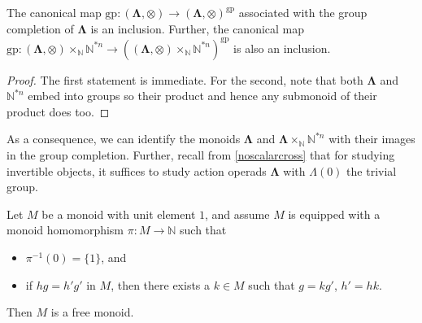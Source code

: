 \documentclass{amsbook} %
\newcommand{\ML}{\mathbf{\Lambda}}
\numberwithin{section}{chapter}
\begin{document}
\begin{cor} \label{gpcompin} The canonical map $\mathrm{gp} : (\ML, \otimes) \to (\ML, \otimes)^{\mathrm{gp}}$ associated with the group completion of $\ML$ is an inclusion. Further, the canonical map $\mathrm{gp} : (\ML, \otimes) \times_{\mathbb{N}} \mathbb{N}^{\ast n} \to ((\ML, \otimes) \times_{\mathbb{N}} \mathbb{N}^{\ast n})^{\mathrm{gp}}$  is also an inclusion.
\end{cor}
\begin{proof}
The first statement is immediate. For the second, note that both $\ML$ and $\mathbb{N}^{\ast n}$ embed into groups so their product and hence any submonoid of their product does too.
\end{proof}

As a consequence, we can identify the monoids $\ML$ and $\ML\times_{\mathbb{N}} \mathbb{N}^{\ast n}$ with their images in the group completion. Further, recall from \cref{noscalarcross} that for studying invertible objects, it suffices to study action operads $\ML$ with $\Lambda(0)$ the trivial group.

\begin{prop}\label{Gfree}
Let $M$ be a monoid with unit element $1$, and assume $M$ is equipped with a monoid homomorphism $\pi: M \to \mathbb{N}$ such that 
\begin{itemize}
\item $\pi^{-1}(0) = \{1\}$, and
\item if $hg = h' g'$ in $M$, then there exists a $k \in M$ such that $g = kg'$, $h' = hk$.
\end{itemize}
Then $M$ is a free monoid.
\end{prop}

\end{document}
